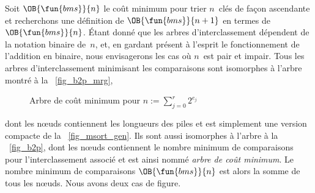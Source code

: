 
Soit \(\OB{\fun{bms}}{n}\) le coût
minimum pour trier \(n\)~clés de façon ascendante et recherchons une
définition de \(\OB{\fun{bms}}{n+1}\) en termes de
\(\OB{\fun{bms}}{n}\). Étant donné que les arbres
d'interclassement dépendent de
la notation binaire de~\(n\), et, en gardant présent à l'esprit le
fonctionnement de l'addition en binaire, nous envisagerons les cas où
\(n\)~est pair et impair. Tous les arbres d'interclassement minimisant
les comparaisons sont isomorphes
à l'arbre montré à la \fig~\ref{fig_b2p_mrg},
\begin{figure}[t]
\centering
{}
\qquad
{}
\caption{Arbre de coût minimum pour $n := \sum_{j=0}^{r}{2^{e_j}}$
\label{fig_B2p}}
\end{figure}
dont les n{\oe}uds contiennent les longueurs des piles et est
simplement une version compacte de la \fig~\ref{fig_msort_gen}. Ils
sont aussi isomorphes à l'arbre à la \fig~\ref{fig_b2p}, dont les
n{\oe}uds contiennent le nombre minimum de comparaisons pour
l'interclassement associé et est ainsi nommé \emph{arbre de coût
  minimum}. Le nombre minimum de comparaisons \(\OB{\fun{bms}}{n}\)
est alors la somme de tous les n{\oe}uds. Nous avons deux cas de
figure.

\medskip

